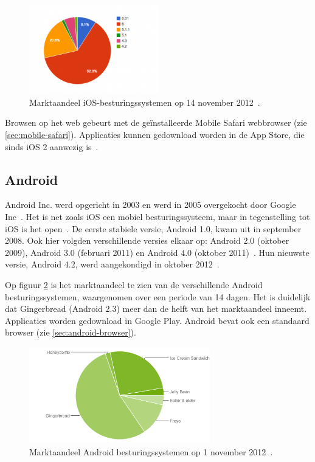 \begin{figure}
  \centering
  \includegraphics[width=0.5\textwidth]{figuren/marketshare-ios-2012-11-14.png}
  \caption{Marktaandeel iOS-besturingssystemen op 14 november 2012~\cite{Sylvain2012}.}
  \label{fig:marketshare-ios}
\end{figure}

Browsen op het web gebeurt met de geïnstalleerde Mobile Safari webbrowser (zie \ref{sec:mobile-safari}). Applicaties kunnen gedownload worden in de App Store, die sinds iOS 2 aanwezig is~\cite{Deitel2012}. 

\subsection{Android}
Android Inc. werd opgericht in 2003 en werd in 2005 overgekocht door Google Inc~\cite{Satyesh2012}. Het is net zoals iOS een mobiel besturingssysteem, maar in tegenstelling tot iOS is het open~\cite{David2011}. De eerste stabiele versie, Android 1.0, kwam uit in september 2008. Ook hier volgden verschillende versies elkaar op: Android 2.0 (oktober 2009), Android 3.0 (februari 2011) en Android 4.0 (oktober 2011)~\cite{Satyesh2012}. Hun nieuwste versie, Android 4.2, werd aangekondigd in oktober 2012~\cite{Sawers2012}. 

Op figuur \ref{fig:marketshare-android} is het marktaandeel te zien van de verschillende Android besturingssystemen, waargenomen over een periode van 14 dagen. Het is duidelijk dat Gingerbread (Android 2.3) meer dan de helft van het marktaandeel inneemt.
Applicaties worden gedownload in Google Play. Android bevat ook een standaard browser (zie \ref{sec:android-browser}).

\begin{figure}
  \centering
  \includegraphics[width=0.7\textwidth]{figuren/marketshare-android-2012-11-01.png}
  \caption{Marktaandeel Android besturingssystemen op 1 november 2012~\cite{Android2012}.}
  \label{fig:marketshare-android}
\end{figure}

